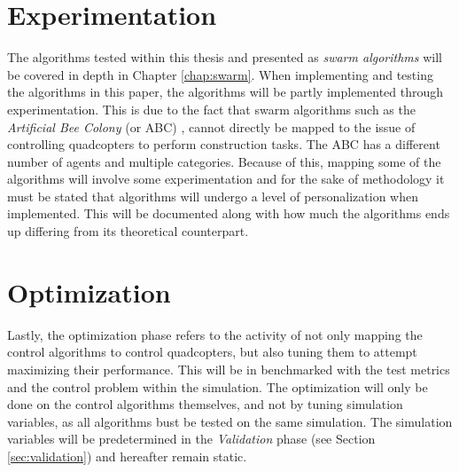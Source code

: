 \section{Experimentation}
The algorithms tested within this thesis and presented as \textit{swarm algorithms} will be covered in depth in Chapter \ref{chap:swarm}. When implementing and testing the algorithms in this paper, the algorithms will be partly implemented through experimentation. This is due to the fact that swarm algorithms such as the \textit{Artificial Bee Colony} (or ABC) \cite{bhattacharjee_multi-robot_2011}, cannot directly be mapped to the issue of controlling quadcopters to perform construction tasks. The ABC has a different number of agents and multiple categories. Because of this, mapping some of the algorithms will involve some experimentation and for the sake of methodology it must be stated that algorithms will undergo a level of personalization when implemented. This will be documented along with how much the algorithms ends up differing from its theoretical counterpart. 

\section{Optimization}
Lastly, the optimization phase refers to the activity of not only mapping the control algorithms to control quadcopters, but also tuning them to attempt maximizing their performance. This will be in benchmarked with the test metrics and the control problem within the simulation. The optimization will only be done on the control algorithms themselves, and not by tuning simulation variables, as all algorithms bust be tested on the same simulation. The simulation variables will be predetermined in the \textit{Validation} phase (see Section \ref{sec:validation}) and hereafter remain static. 



